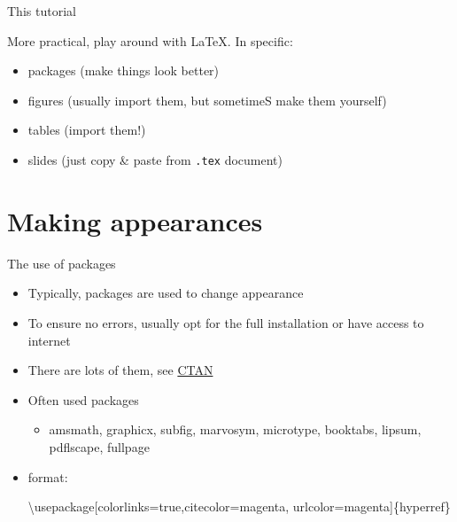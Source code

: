 \documentclass[ignorenonframetext,]{beamer}
\newenvironment{Shaded}{\begin{snugshade}}{\end{snugshade}}
\newcommand{\NormalTok}[1]{{#1}}
\begin{document}
\begin{frame}{This tutorial}

More practical, play around with \LaTeX. In specific:

\begin{itemize}
\itemsep1pt\parskip0pt
\item
  packages (make things look better)
\item
  figures (usually import them, but sometimeS make them yourself)
\item
  tables (import them!)
\item
  slides (just copy \& paste from \texttt{.tex} document)
\end{itemize}

\end{frame}

\section{Making appearances}\label{making-appearances}

\begin{frame}[fragile]{The use of packages}

\begin{itemize}
\item
  Typically, packages are used to change appearance
\item
  To ensure no errors, usually opt for the full installation or have
  access to internet
\item
  There are lots of them, see \href{http://www.ctan.org}{CTAN}
\item
  Often used packages

  \begin{itemize}
  \itemsep1pt\parskip0pt
  \item
    amsmath, graphicx, subfig, marvosym, microtype, booktabs, lipsum,
    pdflscape, fullpage
  \end{itemize}
\item
  format:

\begin{Shaded}
\begin{Highlighting}[]
\NormalTok{\textbackslash{}usepackage[colorlinks=true,citecolor=magenta,}
        \NormalTok{urlcolor=magenta]\{hyperref\} }
\end{Highlighting}
\end{Shaded}
\end{itemize}

\end{frame}
\end{document}
